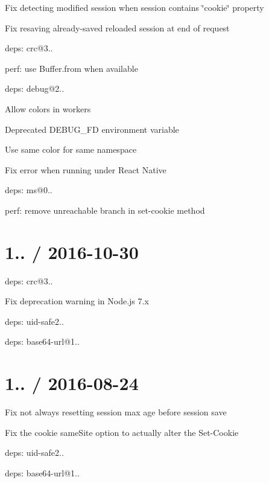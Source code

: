 \begin{DoxyItemize}
\item Fix detecting modified session when session contains \char`\"{}cookie\char`\"{} property
\item Fix resaving already-\/saved reloaded session at end of request
\item deps\+: crc@3..
\begin{DoxyItemize}
\item perf\+: use {\ttfamily Buffer.\+from} when available
\end{DoxyItemize}
\item deps\+: debug@2..
\begin{DoxyItemize}
\item Allow colors in workers
\item Deprecated {\ttfamily D\+E\+B\+U\+G\+\_\+\+FD} environment variable
\item Use same color for same namespace
\item Fix error when running under React Native
\item deps\+: ms@0..
\end{DoxyItemize}
\item perf\+: remove unreachable branch in set-\/cookie method
\end{DoxyItemize}

\section*{1.. / 2016-\/10-\/30 }


\begin{DoxyItemize}
\item deps\+: crc@3..
\begin{DoxyItemize}
\item Fix deprecation warning in Node.\+js 7.\+x
\end{DoxyItemize}
\item deps\+: uid-\/safe2..
\begin{DoxyItemize}
\item deps\+: base64-\/url@1..
\end{DoxyItemize}
\end{DoxyItemize}

\section*{1.. / 2016-\/08-\/24 }


\begin{DoxyItemize}
\item Fix not always resetting session max age before session save
\item Fix the cookie {\ttfamily same\+Site} option to actually alter the {\ttfamily Set-\/\+Cookie}
\item deps\+: uid-\/safe2..
\begin{DoxyItemize}
\item deps\+: base64-\/url@1..
\end{DoxyItemize}
\end{DoxyItemize}

